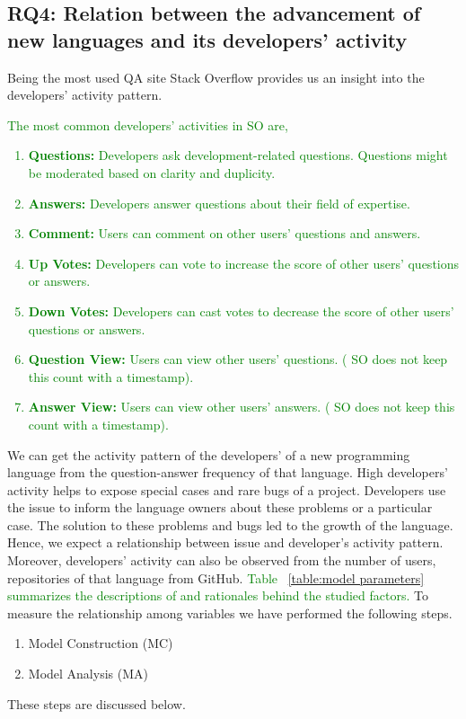 \subsection{RQ4: Relation between the advancement of new languages and its developers' activity}
\label{RQ3}
Being the most used QA site Stack Overflow provides us an insight into the developers' activity pattern. \textcolor{green}{The most common developers' activities in SO \citep{Badashian2014} are,
\begin{enumerate}
    \item \textbf{Questions:} Developers ask development-related questions. Questions might be moderated based on clarity and duplicity.
    \item \textbf{Answers:}  Developers answer questions about their field of expertise.
    \item \textbf{Comment:} Users can comment on other users' questions and answers.
    \item \textbf{Up Votes:} Developers can vote to increase the score of other users' questions or answers.
    \item \textbf{Down Votes:} Developers can cast votes to decrease the score of other users' questions or answers.
    \item \textbf{Question View:} Users can view other users' questions. ( SO does not keep this count with a timestamp).
    \item \textbf{Answer View:} Users can view other users' answers. ( SO does not keep this count with a timestamp).
\end{enumerate}}
We can get the activity pattern of the developers' of a new programming language from the question-answer frequency of that language. High developers' activity helps to expose special cases and rare bugs of a project. Developers use the issue to inform the language owners about these problems or a particular case. The solution to these problems and bugs led to the growth of the language. Hence, we expect a  relationship between issue and developer's activity pattern. Moreover, developers' activity can also be observed from the number of users, repositories of that language from GitHub. \textcolor{green}{Table ~\ref{table:model parameters} summarizes the descriptions of and rationales behind the studied factors.} To measure the relationship among variables we have performed the following steps.

\begin{enumerate}
    \item Model Construction (MC)
    \item Model Analysis (MA)
\end{enumerate}
These steps are discussed below.

